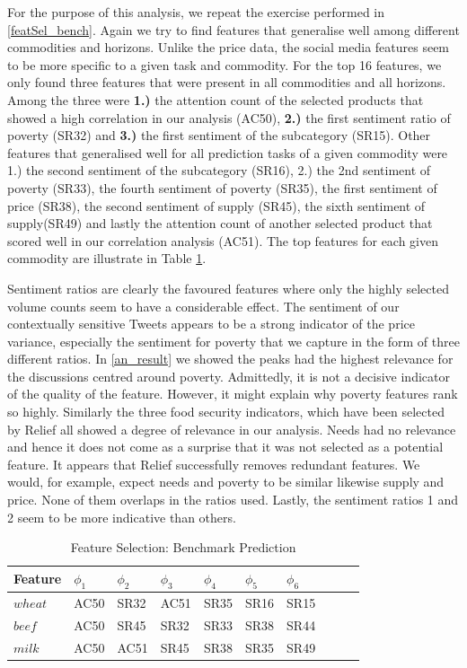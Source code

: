 For the purpose of this analysis, we repeat the exercise performed in \ref{featSel_bench}. Again we try to find features that generalise well among different commodities and horizons. Unlike the price data, the social media features seem to be more specific to a given task and commodity. For the top 16 features, we only found three features that were present in all commodities and all horizons. Among the three were \textbf{1.)} the attention count of the selected products that showed a high correlation in our analysis (AC50), \textbf{2.)} the first sentiment ratio of poverty (SR32) and \textbf{3.)} the first sentiment of the subcategory (SR15). Other features that generalised well for all prediction tasks of a given commodity were 1.) the second sentiment of the subcategory (SR16), 2.) the 2nd sentiment of poverty (SR33), the fourth sentiment of poverty (SR35), the first sentiment of price (SR38), the second sentiment of supply (SR45), the sixth sentiment of supply(SR49) and lastly the attention count of another selected product that scored well in our correlation analysis (AC51). The top features for each given commodity are illustrate in Table \ref{tab:feat_mod2}.

Sentiment ratios are clearly the favoured features where only the highly selected volume counts seem to have a considerable effect. The sentiment of our contextually sensitive Tweets appears to be a strong indicator of the price variance, especially the sentiment for poverty that we capture in the form of three different ratios. In \ref{an_result} we showed the peaks had the highest relevance for the discussions centred around poverty. Admittedly, it is not a decisive indicator of the quality of the feature. However, it might explain why poverty features rank so highly. Similarly the three food security indicators, which have been selected by Relief all showed a degree of relevance in our analysis. Needs had no relevance and hence it does not come as a surprise that it was not selected as a potential feature. It appears that Relief successfully removes redundant features. We would, for example, expect needs and poverty to be similar likewise supply and price. None of them overlaps in the ratios used. Lastly, the sentiment ratios 1 and 2 seem to be more indicative than others. 


\begin{table}[H]
\centering
\begin{tabular}{ |p{2cm}|p{1cm}|p{1cm}|p{1cm}|p{1cm}|p{1cm}|p{1cm}|p{1cm}|p{1cm}|p{1cm}| }
  \hline
 Feature &  $\phi_1$ &  $\phi_2$ &  $\phi_3$ &  $\phi_4$ &  $\phi_5$&  $\phi_6$    \\
 \hline

 $wheat$ & AC50   & SR32   & AC51 &  SR35  & SR16 & SR15 \\
  \hline
  $beef$ & AC50 & SR45 & SR32 & SR33 & SR38 & SR44  \\
  \hline
  $milk$ & AC50 & AC51 & SR45 & SR38 & SR35 & SR49  \\

  \hline
 \end{tabular}
\caption{Feature Selection: Benchmark Prediction}
\label{tab:feat_mod2}
\end{table}


